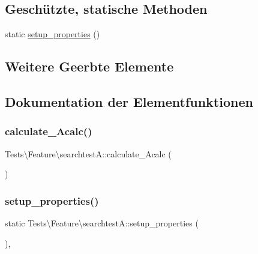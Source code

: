 \subsection*{Geschützte, statische Methoden}
\begin{DoxyCompactItemize}
\item 
static \hyperlink{classTests_1_1Feature_1_1searchtestA_a474d38bb9487a5dc266ea79108f25183}{setup\+\_\+properties} ()
\end{DoxyCompactItemize}
\subsection*{Weitere Geerbte Elemente}


\subsection{Dokumentation der Elementfunktionen}
\mbox{\label{classTests_1_1Feature_1_1searchtestA_ad882fb1472112342a779982c8f623208}} 
\subsubsection{\texorpdfstring{calculate\+\_\+\+Acalc()}{calculate\_Acalc()}}
{\footnotesize\ttfamily Tests\textbackslash{}\+Feature\textbackslash{}searchtest\+A\+::calculate\+\_\+\+Acalc (\begin{DoxyParamCaption}{ }\end{DoxyParamCaption})}

\mbox{\label{classTests_1_1Feature_1_1searchtestA_a474d38bb9487a5dc266ea79108f25183}} 
\subsubsection{\texorpdfstring{setup\+\_\+properties()}{setup\_properties()}}
{\footnotesize\ttfamily static Tests\textbackslash{}\+Feature\textbackslash{}searchtest\+A\+::setup\+\_\+properties (\begin{DoxyParamCaption}{ }\end{DoxyParamCaption})\hspace{0.3cm}{\ttfamily [static]}, {\ttfamily [protected]}}



